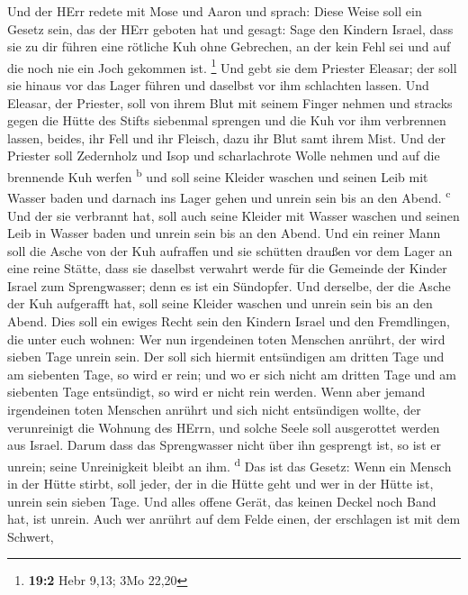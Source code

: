  Und der HErr redete mit Mose und Aaron und sprach:
 Diese Weise soll ein Gesetz sein, das der HErr geboten
hat und gesagt: Sage den Kindern Israel, dass sie zu dir führen eine
rötliche Kuh ohne Gebrechen, an der kein Fehl sei und auf die noch nie
ein Joch gekommen ist. \footnote{\textbf{19:2} Hebr 9,13; 3Mo 22,20}
 Und gebt sie dem Priester Eleasar; der soll sie hinaus
vor das Lager führen und daselbst vor ihm schlachten lassen.
 Und Eleasar, der Priester, soll von ihrem Blut mit seinem
Finger nehmen und stracks gegen die Hütte des Stifts siebenmal sprengen
 und die Kuh vor ihm verbrennen lassen, beides, ihr Fell
und ihr Fleisch, dazu ihr Blut samt ihrem Mist.  Und der
Priester soll Zedernholz und Isop und scharlachrote Wolle nehmen und auf
die brennende Kuh werfen \textsuperscript{b}  und soll
seine Kleider waschen und seinen Leib mit Wasser baden und darnach ins
Lager gehen und unrein sein bis an den Abend. \textsuperscript{c}
 Und der sie verbrannt hat, soll auch seine Kleider mit
Wasser waschen und seinen Leib in Wasser baden und unrein sein bis an
den Abend.  Und ein reiner Mann soll die Asche von der Kuh
aufraffen und sie schütten draußen vor dem Lager an eine reine Stätte,
dass sie daselbst verwahrt werde für die Gemeinde der Kinder Israel zum
Sprengwasser; denn es ist ein Sündopfer.  Und derselbe,
der die Asche der Kuh aufgerafft hat, soll seine Kleider waschen und
unrein sein bis an den Abend. Dies soll ein ewiges Recht sein den
Kindern Israel und den Fremdlingen, die unter euch wohnen:
 Wer nun irgendeinen toten Menschen anrührt, der wird
sieben Tage unrein sein.  Der soll sich hiermit
entsündigen am dritten Tage und am siebenten Tage, so wird er rein; und
wo er sich nicht am dritten Tage und am siebenten Tage entsündigt, so
wird er nicht rein werden.  Wenn aber jemand irgendeinen
toten Menschen anrührt und sich nicht entsündigen wollte, der
verunreinigt die Wohnung des HErrn, und solche Seele soll ausgerottet
werden aus Israel. Darum dass das Sprengwasser nicht über ihn gesprengt
ist, so ist er unrein; seine Unreinigkeit bleibt an ihm.
\textsuperscript{d}  Das ist das Gesetz: Wenn ein Mensch
in der Hütte stirbt, soll jeder, der in die Hütte geht und wer in der
Hütte ist, unrein sein sieben Tage.  Und alles offene
Gerät, das keinen Deckel noch Band hat, ist unrein.  Auch
wer anrührt auf dem Felde einen, der erschlagen ist mit dem Schwert,
